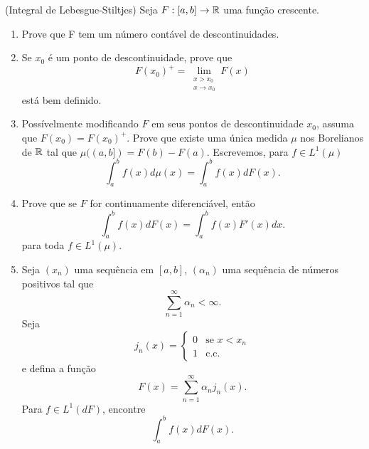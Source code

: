\begin{problem}
    \label{prob:l7:4}
    (Integral de Lebesgue-Stiltjes) Seja $F:[a,b] \rightarrow \mathbb{R}$ uma função crescente.
    \begin{enumerate}[label=(\alph*)]
        \item Prove que F tem um número contável de descontinuidades.
        \item Se $x_0$ é um ponto de descontinuidade, prove que 
        $$F(x_0)^+ = \lim\limits_{\substack{x>x_0 \\ x\to x_0}} F(x)$$
        está bem definido.
        \item Possívelmente modificando $F$ em seus pontos de descontinuidade $x_0$, assuma que $F(x_0) = F(x_0)^+$. Prove que 
        existe uma única medida $\mu$ nos Borelianos de $\mathbb{R}$ tal que $\mu((a,b]) = F(b) - F(a)$. Escrevemos, para $f \in L^1(\mu)$
        $$\int_{a}^{b} f(x) d\mu(x) = \int_{a}^{b} f(x)dF(x).$$
        \item Prove que se $F$ for continuamente diferenciável, então 
        $$\int_{a}^{b} f(x)dF(x) = \int_{a}^{b} f(x)F'(x)dx.$$
        para toda $f \in L^1(\mu)$.
        \item Seja $(x_n)$ uma sequência em $[a,b]$, $(\alpha_n)$ uma sequência de números positivos tal que 
        $$\sum_{n=1}^{\infty} \alpha_n < \infty.$$
        Seja
        $$j_n(x) = \begin{cases}
            0 & \text{se } x < x_n\\
            1 & \text{c.c.}
        \end{cases}$$
        e defina a função 
        $$F(x) = \sum_{n=1}^{\infty} \alpha_nj_n(x).$$
        Para $f \in L^1(dF)$, encontre 
        $$\int_{a}^{b} f(x)dF(x).$$
    \end{enumerate}
\end{problem}
